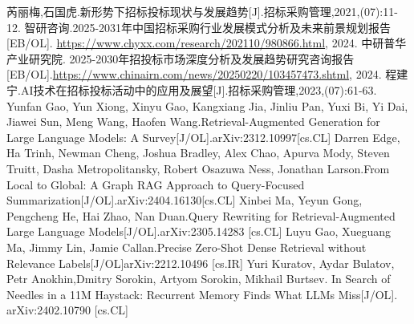 \documentclass{xmu}
\begin{document}
\begin{reference}
    \begin{thebibliography}{5}
        芮丽梅,石国虎.新形势下招标投标现状与发展趋势[J].招标采购管理,2021,(07):11-12.
        智研咨询.2025-2031年中国招标采购行业发展模式分析及未来前景规划报告[EB/OL]. \url{https://www.chyxx.com/research/202110/980866.html}, 2024.
        中研普华产业研究院.
            2025-2030年招投标市场深度分析及发展趋势研究咨询报告[EB/OL].\url{https://www.chinairn.com/news/20250220/103457473.shtml}, 2024.
        程建宁.AI技术在招标投标活动中的应用及展望[J].招标采购管理,2023,(07):61-63.
        Yunfan Gao, Yun Xiong, Xinyu Gao, Kangxiang Jia, Jinliu Pan, Yuxi Bi, Yi Dai, Jiawei Sun, Meng Wang, Haofen Wang.Retrieval-Augmented Generation for Large Language Models: A Survey[J/OL].arXiv:2312.10997[cs.CL]
        Darren Edge, Ha Trinh, Newman Cheng, Joshua Bradley, Alex Chao, Apurva Mody, Steven Truitt, Dasha Metropolitansky, Robert Osazuwa Ness, Jonathan Larson.From Local to Global: A Graph RAG Approach to Query-Focused Summarization[J/OL].arXiv:2404.16130[cs.CL]
        Xinbei Ma, Yeyun Gong, Pengcheng He, Hai Zhao, Nan Duan.Query Rewriting for Retrieval-Augmented Large Language Models[J/OL].arXiv:2305.14283 [cs.CL]
        Luyu Gao, Xueguang Ma, Jimmy Lin, Jamie Callan.Precise Zero-Shot Dense Retrieval without Relevance Labels[J/OL]arXiv:2212.10496 [cs.IR]
        Yuri Kuratov, Aydar Bulatov, Petr Anokhin,Dmitry Sorokin, Artyom Sorokin, Mikhail Burtsev.
            In Search of Needles in a 11M Haystack: Recurrent Memory Finds What LLMs Miss[J/OL].
            arXiv:2402.10790 [cs.CL]
    \end{thebibliography}
\end{reference}

\end{document}
